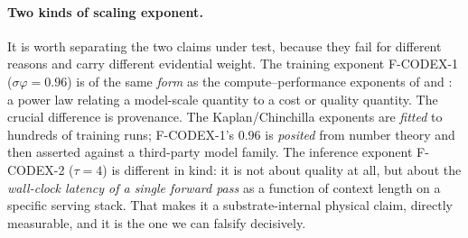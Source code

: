 \documentclass[11pt,a4paper]{article}
\begin{document}
\paragraph{Two kinds of scaling exponent.}
It is worth separating the two claims under test, because they fail for
different reasons and carry different evidential weight. The training exponent
F-CODEX-1 (\(\sigma\varphi = 0.96\)) is of the same \emph{form} as the
compute--performance exponents of \citet{kaplan2020scaling} and
\citet{hoffmann2022chinchilla}: a power law relating a model-scale quantity to a
cost or quality quantity. The crucial difference is provenance. The
Kaplan/Chinchilla exponents are \emph{fitted} to hundreds of training runs;
F-CODEX-1's \(0.96\) is \emph{posited} from number theory and then asserted
against a third-party model family. The inference exponent F-CODEX-2
(\(\tau = 4\)) is different in kind: it is not about quality at all, but about
the \emph{wall-clock latency of a single forward pass} as a function of context
length on a specific serving stack. That makes it a substrate-internal physical
claim, directly measurable, and it is the one we can falsify decisively.
\end{document}

